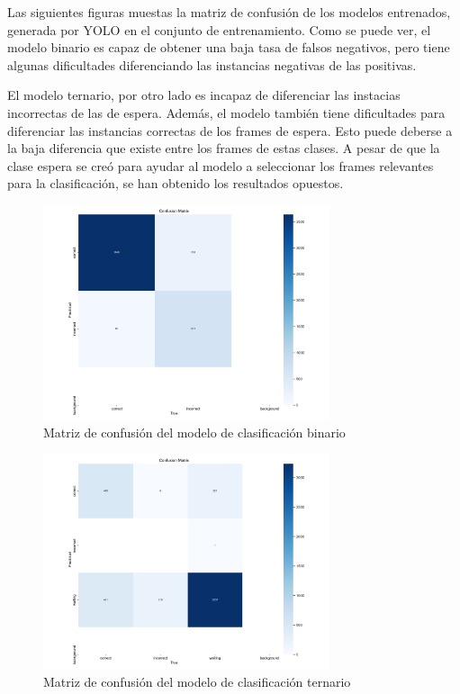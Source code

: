 \documentclass[12pt]{report} %
\begin{document}
    Las siguientes figuras muestas la matriz de confusión de los modelos
    entrenados, generada por YOLO en el conjunto de entrenamiento. Como se puede
    ver, el modelo binario es capaz de obtener una baja tasa de falsos
    negativos, pero tiene algunas dificultades diferenciando las instancias
    negativas de las positivas.

    El modelo ternario, por otro lado es incapaz de diferenciar las instacias
    incorrectas de las de espera.  Además, el modelo también tiene dificultades
    para diferenciar las instancias correctas de los frames de espera. Esto
    puede deberse a la baja diferencia que existe entre los frames de estas
    clases. A pesar de que la clase espera se creó para ayudar al modelo a
    seleccionar los frames relevantes para la clasificación, se han obtenido los
    resultados opuestos.

    \begin{figure}[H]
    \includegraphics[width=0.75\textwidth]{confusion_matrix2.png}
    \caption  {Matriz de confusión del modelo de clasificación binario}
    \end{figure}
    \begin{figure}[H]
    \includegraphics[width=0.75\textwidth]{confusion_matrix3.png}
    \caption  {Matriz de confusión del modelo de clasificación ternario}
    \end{figure}
\end{document}

